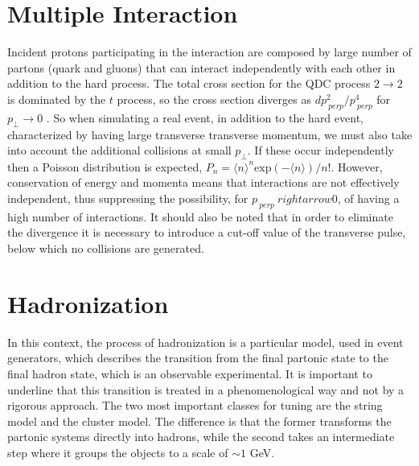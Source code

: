 \section{Multiple Interaction}
Incident protons participating in the interaction are composed by  large number of partons (quark and gluons) that can interact independently with each other in addition to the hard process.
The total cross section for the QDC process $ 2 \rightarrow2 $ is dominated by the $ t $ process, so the cross section diverges as $ d p _ {\ perp} ^ 2 / p _ {\ perp} ^ 4 $ for $ p _ {\perp} \rightarrow 0 $ \cite{Sjostrand: 2006su}.
So when simulating a real event, in addition to the hard event, characterized by having large transverse transverse momentum, we must also take into account the additional collisions at small $ p _{\perp} $. If these occur independently then a Poisson distribution is expected, $ P_n = \langle n \rangle ^ n \mbox {exp} (- \langle n \rangle) / n! $. However, conservation of energy and momenta means that interactions are not effectively independent, thus suppressing the possibility, for $ p _ {\ perp} \ rightarrow 0 $, of having a high number of interactions.
It should also be noted that in order to eliminate the divergence it is necessary to introduce a cut-off value of the transverse pulse, below which no collisions are generated.



\section{Hadronization }
In this context, the process of hadronization is a particular model, used in event generators, which describes the transition from the final partonic state to the final hadron state, which is an observable experimental. It is important to underline that this transition is treated in a phenomenological way and not by a rigorous approach. The two most important classes for tuning are the string model and the cluster model. The difference is that the former transforms the partonic systems directly into hadrons, while the second takes an intermediate step where it groups the objects to a scale of $ \sim 1 $ GeV.

